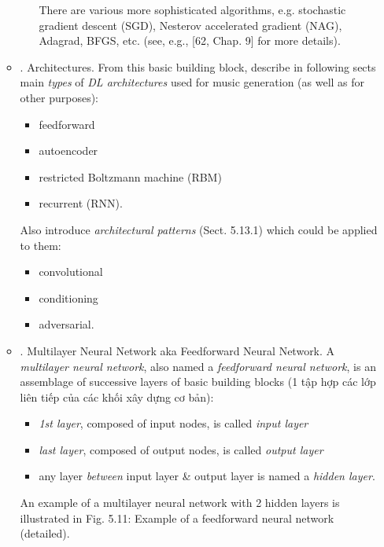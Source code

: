 \documentclass{article}
\begin{document}
\begin{itemize}
\begin{itemize}
\begin{itemize}
			There are various more sophisticated algorithms, e.g. stochastic gradient descent (SGD), Nesterov accelerated gradient (NAG), Adagrad, BFGS, etc. (see, e.g., [62, Chap. 9] for more details).
		\end{itemize}
		\item {. Architectures.} From this basic building block, describe in following sects main {\it types} of {\it DL architectures} used for music generation (as well as for other purposes):
		\begin{itemize}
			\item feedforward
			\item autoencoder
			\item restricted Boltzmann machine (RBM)
			\item recurrent (RNN).
		\end{itemize}
		Also introduce {\it architectural patterns} (Sect. 5.13.1) which could be applied to them:
		\begin{itemize}
			\item convolutional
			\item conditioning
			\item adversarial.
		\end{itemize}
		\item {. Multilayer Neural Network aka Feedforward Neural Network.} A {\it multilayer neural network}, also named a {\it feedforward neural network}, is an assemblage of successive layers of basic building blocks (1 tập hợp các lớp liên tiếp của các khối xây dựng cơ bản):
		\begin{itemize}
			\item {\it1st layer}, composed of input nodes, is called {\it input layer}
			\item {\it last layer}, composed of output nodes, is called {\it output layer}
			\item any layer {\it between} input layer \& output layer is named a {\it hidden layer}.
		\end{itemize}
		An example of a multilayer neural network with 2 hidden layers is illustrated in {\sf Fig. 5.11: Example of a feedforward neural network (detailed).}


\end{itemize}
\end{itemize}
\end{document}
